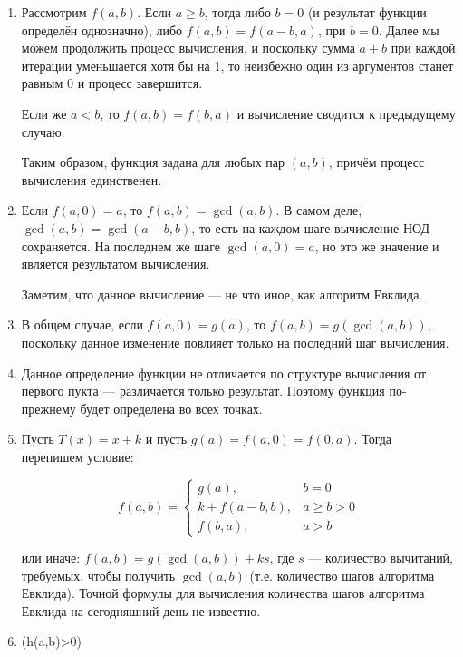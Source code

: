 
\begin{enumerate}
\item Рассмотрим $f(a,b)$. Если $a \ge b$, тогда либо $b = 0$ (и результат функции определён однозначно),
либо $f(a,b) = f(a-b,a)$, при $b = 0$. Далее мы можем продолжить процесс вычисления, и поскольку
сумма $a+b$ при каждой итерации уменьшается хотя бы на 1, то неизбежно один из аргументов
станет равным $0$ и процесс завершится. 

Если же $a < b$, то $f(a,b) = f(b,a)$ и вычисление сводится к предыдущему случаю.

Таким образом, функция задана для любых пар $(a,b)$, причём процесс вычисления единственен.

\item Если $f(a,0) = a$, то $f(a,b) = \gcd(a,b)$.
В самом деле, $\gcd(a,b) = \gcd(a-b,b)$, то есть на каждом шаге вычисление НОД сохраняется.
На последнем же шаге $\gcd(a,0) = a$, но это же значение и является результатом вычисления.

Заметим, что данное вычисление --- не что иное, как алгоритм Евклида.

\item В общем случае, если $f(a,0) = g(a)$, то $f(a,b) = g(\gcd(a,b))$, поскольку данное 
изменение повлияет только на последний шаг вычисления.

\item Данное определение функции не отличается по структуре вычисления от первого пукта ---
различается только результат. Поэтому функция по-прежнему будет определена во всех точках.

\item Пусть $T(x) = x + k$ и пусть $g(a) = f(a,0) = f(0,a)$. Тогда перепишем условие:

$$f(a,b) = \left\{\begin{array}{ll}
   g(a), & b = 0\\
   k+f(a-b,b), & a \ge b > 0\\
   f(b,a), & a > b\end{array}\right.$$

или иначе: $f(a,b) = g(\gcd(a,b)) + ks$, где $s$ --- количество вычитаний, требуемых,
чтобы получить $\gcd(a,b)$ (т.е. количество шагов алгоритма Евклида). Точной формулы
для вычисления количества шагов алгоритма Евклида на сегодняшний день не известно.

\item (h(a,b)>0)


\end{enumerate}
